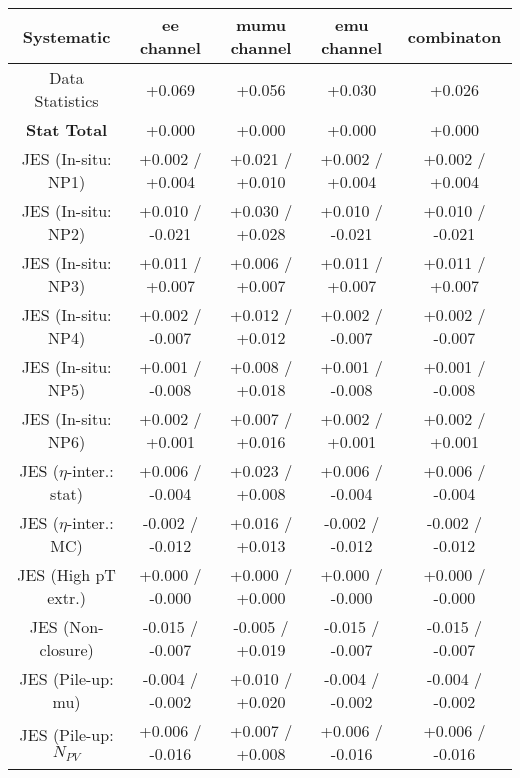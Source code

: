 \begin{table}[htbp]
\scriptsize
  \begin{center} 
  \begin{tabular}{|c|c|c|c|c|}
  \hline
Systematic                            &  ee channel&  mumu channel&  emu channel&  combinaton\\
  \hline
Data Statistics                       &+0.069              & +0.056              & +0.030              & +0.026             \\
\hline
\textbf{Stat Total}                   &+0.000              & +0.000              & +0.000              & +0.000             \\
\hline
JES (In-situ: NP1)                    &+0.002   / +0.004   & +0.021   / +0.010   & +0.002   / +0.004   & +0.002   / +0.004  \\
JES (In-situ: NP2)                    &+0.010   / -0.021   & +0.030   / +0.028   & +0.010   / -0.021   & +0.010   / -0.021  \\
JES (In-situ: NP3)                    &+0.011   / +0.007   & +0.006   / +0.007   & +0.011   / +0.007   & +0.011   / +0.007  \\
JES (In-situ: NP4)                    &+0.002   / -0.007   & +0.012   / +0.012   & +0.002   / -0.007   & +0.002   / -0.007  \\
JES (In-situ: NP5)                    &+0.001   / -0.008   & +0.008   / +0.018   & +0.001   / -0.008   & +0.001   / -0.008  \\
JES (In-situ: NP6)                    &+0.002   / +0.001   & +0.007   / +0.016   & +0.002   / +0.001   & +0.002   / +0.001  \\
JES ($\eta$-inter.: stat)               &+0.006   / -0.004   & +0.023   / +0.008   & +0.006   / -0.004   & +0.006   / -0.004  \\
JES ($\eta$-inter.: MC)                 &-0.002   / -0.012   & +0.016   / +0.013   & -0.002   / -0.012   & -0.002   / -0.012  \\
JES (High pT extr.)                  &+0.000   / -0.000   & +0.000   / +0.000   & +0.000   / -0.000   & +0.000   / -0.000  \\
JES (Non-closure)                     &-0.015   / -0.007   & -0.005   / +0.019   & -0.015   / -0.007   & -0.015   / -0.007  \\
JES (Pile-up: mu)                     &-0.004   / -0.002   & +0.010   / +0.020   & -0.004   / -0.002   & -0.004   / -0.002  \\
JES (Pile-up: $N_{PV}$                  &+0.006   / -0.016   & +0.007   / +0.008   & +0.006   / -0.016   & +0.006   / -0.016  \\

\end{tabular}
\end{center}
\end{table}
